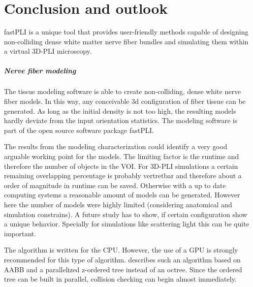 \setcounter{chapter}{8}
\chapter{Conclusion and outlook}
\label{sec:summary}
% 
\ac{fastPLI} is a unique tool that provides user-friendly methods capable of designing non-colliding dense white matter nerve fiber bundles and simulating them within a virtual \ac{3D-PLI} microscopy.
% 
% 
% 
\paragraph{Nerve fiber modeling} %
The tissue modeling software is able to create non-colliding, dense white nerve fiber models.
In this way, any conceivable 3d configuration of fiber tissue can be generated.
As long as the initial density is not too high, the resulting models hardly deviate from the input orientation statistics.
The modeling software is part of the open source software package \ac{fastPLI}.
\par
% 
The results from the modeling characterization could identify a very good arguable working point for the models.
The limiting factor is the runtime and therefore the number of objects in the \ac{VOI}.
For \ac{3D-PLI} simulations a certain remaining overlapping percentage is probably vertretbar and therefore about a order of magnitude in runtime can be saved.
Otherwise with a up to date computing systems a reasonable amount of models can be generated.
However here the number of models were highly limited (considering anatomical and simulation constrains).
A future study has to show, if certain configuration show a unique behavior.
Specially for simulations like scattering light this can be quite important.
\par
% 
The algorithm is written for the \ac{CPU}.
However, the use of a \ac{GPU} is strongly recommended for this type of algorithm.
\cite{Karras2012} describes such an algorithm based on \ac{AABB} and a parallelized z-ordered tree instead of an octree.
Since the ordered tree can be built in parallel, collision checking can begin almost immediately.
% 
% 
% 
